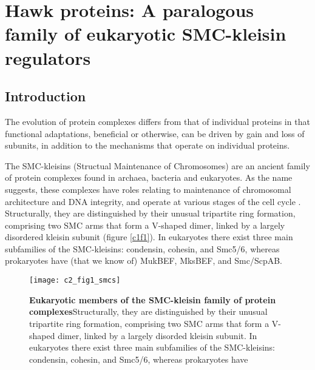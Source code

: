 \documentclass[a4paper,11pt,twoside,openright]{scrbook}
\begin{document}
\chapter{Hawk proteins: A paralogous family of eukaryotic SMC-kleisin regulators} \label{chapter:hawks}


\section{Introduction}
The evolution of protein complexes differs from that of individual proteins in that functional adaptations, beneficial or otherwise, can be driven by gain and loss of subunits, in addition to the mechanisms that operate on individual proteins.

The SMC-kleisins (Structual Maintenance of Chromosomes) are an ancient family of protein complexes found in archaea, bacteria and eukaryotes. As the name suggests, these complexes have roles relating to maintenance of chromosomal architecture and DNA integrity, and operate at various stages of the cell cycle \cite{Nasmyth2009, Hirano2016}. Structurally, they are distinguished by their unusual tripartite ring formation, comprising two SMC arms that form a V-shaped dimer, linked by a largely disordered kleisin subunit (figure \ref{c1f1}). In eukaryotes there exist three main subfamilies of the SMC-kleisins: condensin, cohesin, and Smc5/6, whereas prokaryotes have (that we know of) MukBEF, MksBEF, and Smc/ScpAB.

\begin{figure}[h]
\fcapsideright
    {\caption[Eukaryotic members of the SMC-kleisin family of protein complexes]{\sffamily\textbf{Eukaryotic members of the SMC-kleisin family of protein complexes}\newline \small Structurally, they are distinguished by their unusual tripartite ring formation, comprising two SMC arms that form a V-shaped dimer, linked by a largely disorded kleisin subunit. In eukaryotes there exist three main subfamilies of the SMC-kleisins: condensin, cohesin, and Smc5/6, whereas prokaryotes have }\label{c2f1}}
    {\texttt{[image: c2\_fig1\_smcs]}}
\end{figure}
\end{document}
